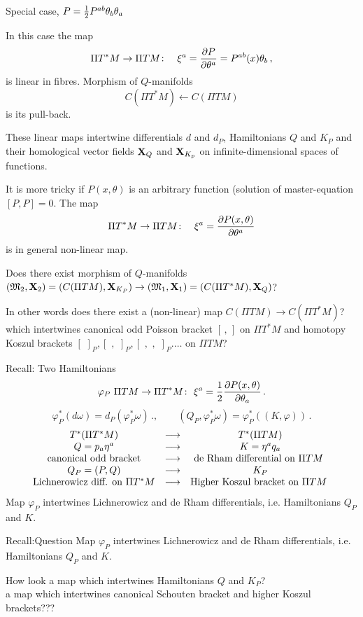 \documentclass{beamer}
\def\w {{\omega}}
\def\p{\partial}
\def\M {{\mathfrak M}}
\def\p {\partial}
\def \X   {{\bf X}}
\begin{document}
\begin{frame} {Special case, $P={1\over 2}P^{ab}\theta_b\theta_a$}  

In this case  the map 
       $$
 \Pi T^*M\to \Pi TM\colon\quad  
\xi^a={\p P\over\p \theta^a}=P^{ab}(x)\theta_b\,,
       $$
is linear in fibres.  
Morphism of $Q$-manifolds
               $$
 C(\Pi T^*M)\leftarrow C(\Pi TM)
           $$ 
is its pull-back.

These linear maps intertwine differentials $d$ and $d_P$, 
Hamiltonians $Q$ and $K_P$  and their homological vector fields
  $\X_Q$ and $\X_{K_p}$
on infinite-dimensional spaces of functions.

  


\end{frame}
\begin{frame}
It is more tricky if 
$P(x,\theta)$ is an arbitrary function 
(solution of master-equation $[P,P]=0$.
The map  
        $$
 \Pi T^*M\to \Pi TM\colon\quad  
\xi^a={\p P(x,\theta)\over\p \theta^a}
       $$
is in general non-linear map.


Does there exist morphism of $Q$-manifolds 
 $(\M_2,\X_2)=(C(\Pi TM),\X_{K_P})\to 
  (\M_1,\X_1)=(C(\Pi T^*M), \X_Q)$?

In other words does there exist a  (non-linear) map 
$C(\Pi TM)\to C(\Pi T^*M)$? which intertwines 
canonical odd Poisson bracket $[\,,\,]$ on $\Pi T^*M$
and homotopy Koszul brackets 
$[\,\,]_P, [\,\,,\,\,]_P, [\,\,,\,\,,\,\,]_P.\dots$ on $\Pi TM$?

\end{frame}
\begin{frame}{Recall: Two Hamiltonians}
         $$
      \varphi_P\,\,\Pi TM\to\Pi T^*M\colon\,\,
 \xi^a={1\over 2}{\p P(x,\theta)\over \p \theta_a}\,.
         $$
         $$
     \varphi_P^*(d\w)=d_P(\varphi_P^*\w)\,.,\qquad
(Q_P,\varphi_P^*\w)=\varphi_P^*\left((K,\varphi)\right)\,.
         $$
          $$
       \begin{matrix}
    T^*(\Pi T^*M) &\longrightarrow & T^*(\Pi TM)\cr
             Q=p_a\eta^a& \longrightarrow &  K=\eta^aq_a\cr
        \hbox{canonical odd bracket} &\longrightarrow&
         \hbox{de Rham differential on $\Pi TM$ }\cr
     Q_P=(P,Q)& \longrightarrow &  K_P\cr
        \hbox{Lichnerowicz diff. on $\Pi T^*M$} &\longrightarrow&
         \hbox{Higher Koszul bracket on $\Pi TM$ }\cr 
       \end{matrix}
        $$
         $$
         $$
Map $\varphi_P$ intertwines Lichnerowicz and de Rham differentials,
i.e. Hamiltonians $Q_P$ and $K$.



\end{frame}
\begin{frame}{Recall:Question}
Map $\varphi_P$ intertwines Lichnerowicz and de Rham differentials,
i.e. Hamiltonians $Q_P$ and $K$.


\bigskip

How look a map which intertwines Hamiltonians $Q$ and $K_P$?\\
 a map which intertwines canonical Schouten bracket and higher 
Koszul brackets???


\end{frame}
\end{document}
